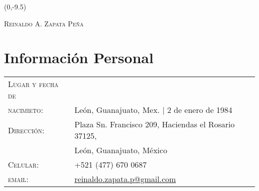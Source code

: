 \documentclass[letterpaper,10pt]{article}
\begin{document}
\begin{textblock}{1}(0,-9.5)
\end{textblock}

\begin{center}
{\Huge \textsc{Reinaldo A. Zapata Pe\~na}}\\[5pt]
{\Large\color{headings}}
\end{center}

\section{Informaci\'on Personal}
\begin{tabular}{R{4cm}l}
\textsc{Lugar y fecha de }	&	\\
\textsc{nacimieto:}			&	Le\'on, Guanajuato, Mex. |  2 de enero de 1984 \\
\textsc{Direcci\'on:}		&	Plaza Sn. Francisco 209, Haciendas el Rosario 37125, \\
							& 	Le\'on, Guanajuato, M\'exico \\
\textsc{Celular:}			&	+521 (477) 670 0687\\
\textsc{email:}				&	\href{mailto:reinaldo.zapata.p@gmail.com}{reinaldo.zapata.p@gmail.com}
\end{tabular}
\end{document}
